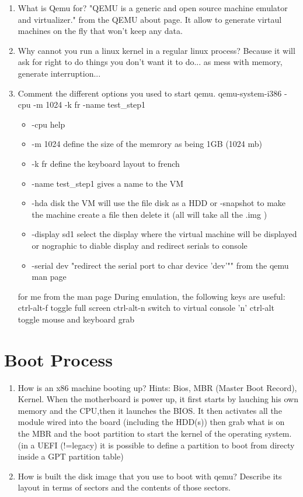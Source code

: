 \documentclass[10]{article}
\begin{document}
\begin{enumerate}
\item 
What is Qemu for?
"QEMU is a generic and open source machine emulator and virtualizer." from the QEMU about page.
It allow to generate virtaul machines on the fly that won't keep any data.
\item
Why cannot you run a linux kernel in a regular linux process?
Because it will ask for right to do things you don't want it to do... as mess with memory, generate interruption...
\item
Comment the different options you used to start qemu.
qemu-system-i386 -cpu -m 1024 -k fr -name test_step1
\begin{itemize}
\item -cpu help
\item -m 1024 			define the size of the memrory as being 1GB (1024 mb)
\item -k fr 			define the keyboard layout to french
\item -name test_step1	gives a name to the VM
\item -hda disk			the VM will use the file disk as a HDD
or -snapshot to make the machine create a file then delete it (all will take all the .img )
\item -display sd1		select the display where the virtual machine will be displayed or nographic to diable display and redirect serials to console
\item -serial dev 		"redirect the serial port to char device 'dev'"" from the qemu man page
\end{itemize}

for me from the man page
During emulation, the following keys are useful:
ctrl-alt-f      toggle full screen
ctrl-alt-n      switch to virtual console 'n'
ctrl-alt        toggle mouse and keyboard grab

\end{enumerate}

\section{Boot Process}

\begin{enumerate}
\item
How is an x86 machine booting up?
Hints: Bios, MBR (Master Boot Record), Kernel.
When the motherboard is power up, it first starts by lauching his own memory and the CPU,then it launches the BIOS. It then activates all the module wired into the board (including the HDD(s)) then grab what is on the MBR and the boot partition to start the kernel of the operating system.
(in a UEFI (!=legacy) it is possible to define a partition to boot from directy inside a GPT partition table)
\item
How is built the disk image that you use to boot with qemu?
Describe its layout in terms of sectors and the contents of 
those sectors.

\end{enumerate}
\end{document}
